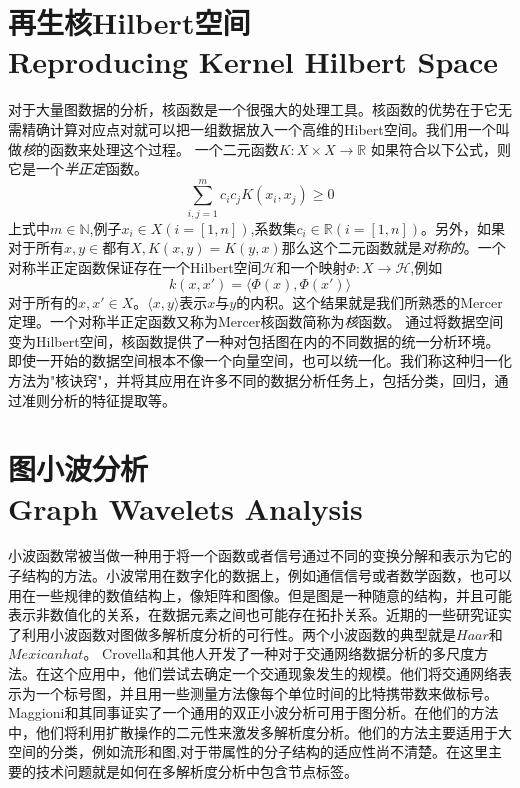 \documentclass{article}
\begin{document}
\section{再生核Hilbert空间 \\ Reproducing Kernel Hilbert Space}
对于大量图数据的分析，核函数是一个很强大的处理工具。核函数的优势在于它无需精确计算对应点对就可以把一组数据放入一个高维的Hibert空间。我们用一个叫做\emph{核}的函数来处理这个过程。
一个二元函数$K:X\times X\rightarrow \mathbb{R}$ 如果符合以下公式，则它是一个\emph{半正定}函数。
\begin{equation}
    \sum_{i,j=1}^{m}c_i c_j K(x_i ,x_j )\geq 0
\end{equation}
上式中$m\in \mathbb{N}$,例子$x_i \in X(i=[1,n])$,系数集$c_i \in \mathbb{R}(i=[1,n])$。另外，如果$对于所有x,y\in 都有X,K(x,y)=K(y,x)$那么这个二元函数就是\emph{对称的}。一个对称半正定函数保证存在一个Hilbert空间$\mathcal{H}$和一个映射$\Phi:X\rightarrow \mathcal{H} $,例如
\begin{equation}
    k(x,x')=\langle\Phi(x),\Phi(x')\rangle
\end{equation}
对于所有的$x,x'\in X $。$\langle x,y\rangle$表示$x$与$y$的内积。这个结果就是我们所熟悉的Mercer定理。一个对称半正定函数又称为Mercer核函数简称为\emph{核}函数。
通过将数据空间变为Hilbert空间，核函数提供了一种对包括图在内的不同数据的统一分析环境。即使一开始的数据空间根本不像一个向量空间，也可以统一化。我们称这种归一化方法为"核诀窍"，并将其应用在许多不同的数据分析任务上，包括分类，回归，通过准则分析的特征提取等。
\section{图小波分析 \\ Graph Wavelets Analysis}
小波函数常被当做一种用于将一个函数或者信号通过不同的变换分解和表示为它的子结构的方法。小波常用在数字化的数据上，例如通信信号或者数学函数，也可以用在一些规律的数值结构上，像矩阵和图像。但是图是一种随意的结构，并且可能表示非数值化的关系，在数据元素之间也可能存在拓扑关系。近期的一些研究证实了利用小波函数对图做多解析度分析的可行性。两个小波函数的典型就是$Haar$和$Mexican hat$。
Crovella和其他人开发了一种对于交通网络数据分析的多尺度方法。在这个应用中，他们尝试去确定一个交通现象发生的规模。他们将交通网络表示为一个标号图，并且用一些测量方法像每个单位时间的比特携带数来做标号。
Maggioni和其同事证实了一个通用的双正小波分析可用于图分析。在他们的方法中，他们将利用扩散操作的二元性来激发多解析度分析。他们的方法主要适用于大空间的分类，例如流形和图,对于带属性的分子结构的适应性尚不清楚。在这里主要的技术问题就是如何在多解析度分析中包含节点标签。


\ifx\allfiles\undefined
%
%
\end{document}
